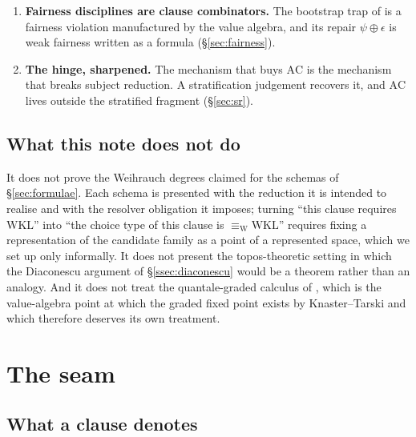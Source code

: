 \documentclass[11pt]{article}
\theoremstyle{definition}
\theoremstyle{plain}
\theoremstyle{remark}
\newcommand{\sumv}{\oplus}
\newcommand{\Cx}{\mathbb{C}}
\newcommand{\AC}{\mathrm{AC}}
\newcommand{\WKL}{\mathrm{WKL}}
\newcommand{\ew}{\equiv_{\mathrm{W}}}
\begin{document}
\begin{enumerate}[label=C\arabic*.,leftmargin=2.6em,itemsep=3pt]
deficit is not a choice function at all, so $\Cx$ is off the lattice rather than high
on it (\S\ref{sec:transverse}).
\item \textbf{Fairness disciplines are clause combinators.} The bootstrap trap of
\cite{gradedwhere} is a fairness violation manufactured by the value algebra, and its
repair $\psi \sumv \epsilon$ is weak fairness written as a formula
(\S\ref{sec:fairness}).
\item \textbf{The hinge, sharpened.} The mechanism that buys $\AC$ is the mechanism
that breaks subject reduction. A stratification judgement recovers it, and $\AC$ lives
outside the stratified fragment (\S\ref{sec:sr}).
\end{enumerate}

\subsection{What this note does not do}

It does not prove the Weihrauch degrees claimed for the schemas of
\S\ref{sec:formulae}. Each schema is presented with the reduction it is intended to
realise and with the resolver obligation it imposes; turning ``this clause requires
$\WKL$'' into ``the choice type of this clause is $\ew \WKL$'' requires fixing a
representation of the candidate family as a point of a represented space, which we set
up only informally. It does not present the topos-theoretic setting in which the
Diaconescu argument of \S\ref{ssec:diaconescu} would be a theorem rather than an
analogy. And it does not treat the quantale-graded calculus of \cite{fuzzyrho}, which
is the value-algebra point at which the graded fixed point exists by Knaster--Tarski
and which therefore deserves its own treatment.

\section{The seam}\label{sec:seam}

\subsection{What a clause denotes}
\end{document}
